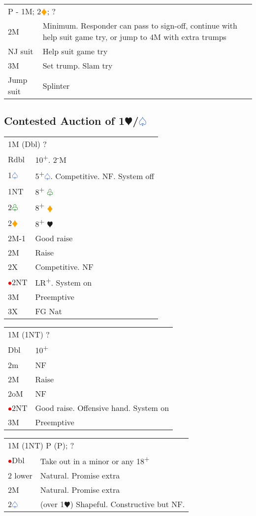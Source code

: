 \documentclass{article}
\renewcommand{\sp}{\textcolor{RoyalBlue}{$\varspade$}}
\newcommand{\he}{\textcolor{RubineRed}{$\varheart$}}
\newcommand{\di}{\textcolor{Orange}{$\vardiamond$}}
\newcommand{\cl}{\textcolor{Green}{$\varclub$}}
\newcommand{\nt}{\relsize{-1}NT\relsize{1}}
\newcommand{\up}{\textsuperscript{+}}
\newcommand{\down}{\textsuperscript{-}}
\newcommand{\al}{\textcolor{red}{$\bullet$}}
\begin{document}
\medskip

\begin{tabular}{|l|p{6.5cm}}
	\multicolumn{2}{l}{P - 1M; 2\di{}; ?}\\
	2M & Minimum. Responder can pass to sign-off, continue with help suit game try, or jump to 4M with extra trumps \\
	NJ suit & Help suit game try \\
	3M & Set trump. Slam try \\
	Jump suit & Splinter \\
\end{tabular}

\subsection{Contested Auction of 1\he/\sp{}}

\begin{tabular}{|l|p{6.5cm}}
	\multicolumn{2}{l}{1M (Dbl) ?} \\
	Rdbl & 10\up. 2\down{}M \\
	1\sp{} & 5\up{}\sp{}. Competitive. NF. System off \\
	1\nt{} & 8\up{} \cl{} \\
	2\cl{} & 8\up{} \di{} \\
	2\di{} & 8\up{} \he{} \\
	2M-1 & Good raise \\
	2M & Raise \\
	2X & Competitive. NF \\
	\al{}2\nt & LR\up{}. System on \\
	3M & Preemptive \\
	3X & FG Nat \\
\end{tabular}

\medskip

\begin{tabular}{|l|p{6.5cm}}
	\multicolumn{2}{l}{1M (1\nt{}) ?} \\
	Dbl & 10\up \\
	2m & NF \\
	2M & Raise \\
	2oM & NF \\
	\al{}2\nt & Good raise. Offensive hand. System on \\
	3M & Preemptive \\
\end{tabular}

\medskip

\begin{tabular}{|l|p{6.5cm}}
	\multicolumn{2}{l}{1M (1\nt{}) P (P); ?} \\
	\al{}Dbl & Take out in a minor or any 18\up{} \\
	2 lower & Natural. Promise extra \\
	2M & Natural. Promise extra \\
	2\sp{} & (over 1\he{}) Shapeful. Constructive but NF.
\end{tabular}
\end{document}
